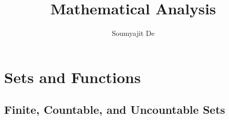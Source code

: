 \documentclass[a4paper,12pt]{report}
\theoremstyle{plain}
\theoremstyle{definition}
\newtheorem{definition}[theorem]{\color{red}Definition} %
\theoremstyle{remark}
\begin{document}
\title{Mathematical Analysis}
\author{Soumyajit De}

\maketitle
\tableofcontents


\setcounter{chapter}{-1}

\chapter{Sets and Functions}
\section{Finite, Countable, and Uncountable Sets}
\end{document}
